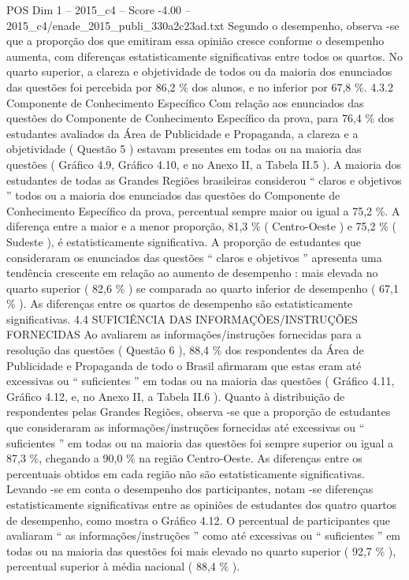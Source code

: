 \begin{textsample}{POS Dim 1 – 2015\_c4 – Score -4.00 – 2015\_c4/enade\_2015\_publi\_330a2c23ad.txt}
Segundo o desempenho, observa -se que a proporção dos que emitiram essa opinião cresce conforme o desempenho aumenta, com diferenças estatisticamente significativas entre todos os quartos.
No quarto superior, a clareza e objetividade de todos ou da maioria dos enunciados das questões foi percebida por 86,2 \% dos alunos, e no inferior por 67,8 \%. 4.3.2 Componente de Conhecimento Específico Com relação aos enunciados das questões do Componente de Conhecimento Específico da prova, para 76,4 \% dos estudantes avaliados da Área de Publicidade e Propaganda, a clareza e a objetividade ( Questão 5 ) estavam presentes em todas ou na maioria das questões ( Gráfico 4.9, Gráfico 4.10, e no Anexo II, a Tabela II.5 ).
A maioria dos estudantes de todas as Grandes Regiões brasileiras considerou “ claros e objetivos ” todos ou a maioria dos enunciados das questões do Componente de Conhecimento Específico da prova, percentual sempre maior ou igual a 75,2 \%.
A diferença entre a maior e a menor proporção, 81,3 \% ( Centro-Oeste ) e 75,2 \% ( Sudeste ), é estatisticamente significativa.
A proporção de estudantes que consideraram os enunciados das questões “ claros e objetivos ” apresenta uma tendência crescente em relação ao aumento de desempenho : mais elevada no quarto superior ( 82,6 \% ) se comparada ao quarto inferior de desempenho ( 67,1 \% ).
As diferenças entre os quartos de desempenho são estatisticamente significativas. 4.4 SUFICIÊNCIA DAS INFORMAÇÕES/INSTRUÇÕES FORNECIDAS Ao avaliarem as informações/instruções fornecidas para a resolução das questões ( Questão 6 ), 88,4 \% dos respondentes da Área de Publicidade e Propaganda de todo o Brasil afirmaram que estas eram até excessivas ou “ suficientes ” em todas ou na maioria das questões ( Gráfico 4.11, Gráfico 4.12, e, no Anexo II, a Tabela II.6 ).
Quanto à distribuição de respondentes pelas Grandes Regiões, observa -se que a proporção de estudantes que consideraram as informações/instruções fornecidas até excessivas ou “ suficientes ” em todas ou na maioria das questões foi sempre superior ou igual a 87,3 \%, chegando a 90,0 \% na região Centro-Oeste.
As diferenças entre os percentuais obtidos em cada região não são estatisticamente significativas.
Levando -se em conta o desempenho dos participantes, notam -se diferenças estatisticamente significativas entre as opiniões de estudantes dos quatro quartos de desempenho, como mostra o Gráfico 4.12.
O percentual de participantes que avaliaram “ as informações/instruções ” como até excessivas ou “ suficientes ” em todas ou na maioria das questões foi mais elevado no quarto superior ( 92,7 \% ), percentual superior à média nacional ( 88,4 \% ).

\end{textsample}
